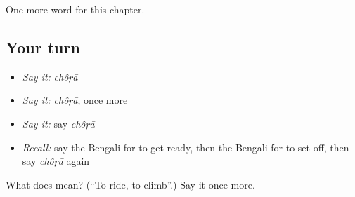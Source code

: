 \begin{grammarlens}[title={What you've built}]
One more word for this chapter.
\end{grammarlens}

\subsection*{Your turn}
\begin{itemize}
\raggedright
  \item \emph{Say it:} \emph{chôṛā}
  \item \emph{Say it:} \emph{chôṛā}, once more
  \item \emph{Say it:} say \emph{chôṛā}
  \item \emph{Recall:} say the Bengali for to get ready, then the Bengali for to set off, then say \emph{chôṛā} again
\end{itemize}

\begin{tcolorbox}[breakable,colback=teal!4,colframe=teal!35!black,title={Before you move on}]
What does  mean? (\textquotedblleft{}To ride, to climb\textquotedblright{}.) Say it once more.
\end{tcolorbox}
